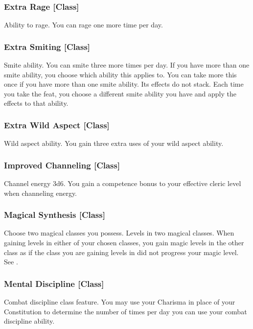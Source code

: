 \subsubsection{Extra Rage [Class]}
 Ability to rage.
 You can rage one more time per day.

\subsubsection{Extra Smiting [Class]}
 Smite ability.
 You can smite three more times per day. If you have more than one smite ability, you choose which ability this applies to.
 You can take more this once if you have more than one smite ability. Its effects do not stack. Each time you take the feat, you choose a different smite ability you have and apply the effects to that ability.

\subsubsection{Extra Wild Aspect [Class]}
 Wild aspect ability.
 You gain three extra uses of your wild aspect ability.

\subsubsection{Improved Channeling [Class]}
 Channel energy 3d6.
 You gain a  competence bonus to your effective cleric level when channeling energy.

\subsubsection{Magical Synthesis [Class]}
Choose two magical classes you possess.
 Levels in two magical classes.
 When gaining levels in either of your chosen classes, you gain magic levels in the other class as if the class you are gaining levels in did not progress your magic level. See .

\subsubsection{Mental Discipline [Class]}
\featpre Combat discipline class feature.
\featben You may use your Charisma in place of your Constitution to determine the number of times per day you can use your combat discipline ability. 

